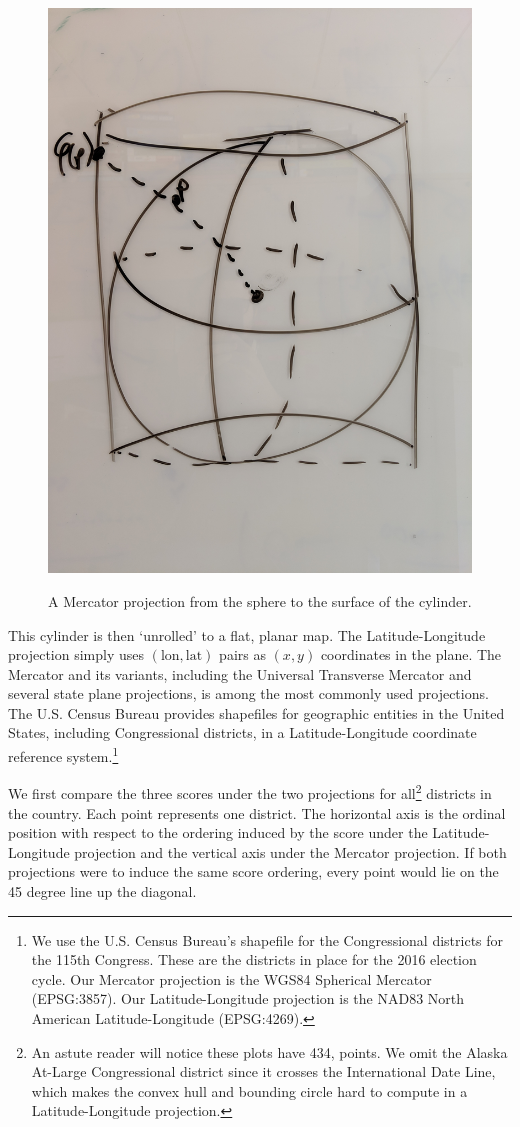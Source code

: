 \begin{figure}
    \centering
    \includegraphics[width=.8\textwidth, angle=270,origin=c]{figs/merc.jpg}\\[1.5em]
    \caption{ A Mercator projection from the sphere to the surface of the cylinder.}
    \label{fig:mercator}
\end{figure}

This cylinder is then `unrolled' to a flat, planar map.  The Latitude-Longitude projection simply uses $(\mathit{\mathrm{lon}},\mathit{\mathrm{lat}})$ pairs as $(x,y)$ coordinates in the plane.  The Mercator and its variants, including the Universal Transverse Mercator and several state plane projections, is among the most commonly used projections.  The U.S. Census Bureau provides shapefiles for geographic entities in the United States, including Congressional districts, in a Latitude-Longitude coordinate reference system.\footnote{We use the U.S. Census Bureau's shapefile for the Congressional districts for the 115th Congress.  These are the districts in place for the 2016 election cycle.  Our Mercator projection is the WGS84 Spherical Mercator (EPSG:3857).  Our Latitude-Longitude projection is the NAD83 North American Latitude-Longitude (EPSG:4269).}


We first compare the three scores under the two projections for all\footnote{An astute reader will notice these plots have 434, points.  We omit the Alaska At-Large Congressional district since it crosses the International Date Line, which makes the convex hull and bounding circle hard to compute in a Latitude-Longitude projection.} districts in the country.  Each point represents one district.  The horizontal axis is the ordinal position with respect to the ordering induced by the score under the Latitude-Longitude projection and the vertical axis under the Mercator projection.  If both projections were to induce the same score ordering, every point would lie on the 45 degree line up the diagonal.


